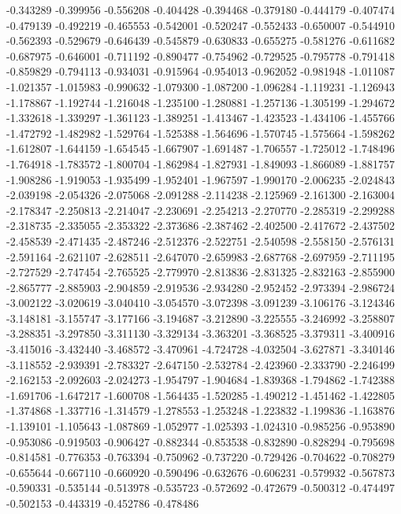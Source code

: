 -0.343289
-0.399956
-0.556208
-0.404428
-0.394468
-0.379180
-0.444179
-0.407474
-0.479139
-0.492219
-0.465553
-0.542001
-0.520247
-0.552433
-0.650007
-0.544910
-0.562393
-0.529679
-0.646439
-0.545879
-0.630833
-0.655275
-0.581276
-0.611682
-0.687975
-0.646001
-0.711192
-0.890477
-0.754962
-0.729525
-0.795778
-0.791418
-0.859829
-0.794113
-0.934031
-0.915964
-0.954013
-0.962052
-0.981948
-1.011087
-1.021357
-1.015983
-0.990632
-1.079300
-1.087200
-1.096284
-1.119231
-1.126943
-1.178867
-1.192744
-1.216048
-1.235100
-1.280881
-1.257136
-1.305199
-1.294672
-1.332618
-1.339297
-1.361123
-1.389251
-1.413467
-1.423523
-1.434106
-1.455766
-1.472792
-1.482982
-1.529764
-1.525388
-1.564696
-1.570745
-1.575664
-1.598262
-1.612807
-1.644159
-1.654545
-1.667907
-1.691487
-1.706557
-1.725012
-1.748496
-1.764918
-1.783572
-1.800704
-1.862984
-1.827931
-1.849093
-1.866089
-1.881757
-1.908286
-1.919053
-1.935499
-1.952401
-1.967597
-1.990170
-2.006235
-2.024843
-2.039198
-2.054326
-2.075068
-2.091288
-2.114238
-2.125969
-2.161300
-2.163004
-2.178347
-2.250813
-2.214047
-2.230691
-2.254213
-2.270770
-2.285319
-2.299288
-2.318735
-2.335055
-2.353322
-2.373686
-2.387462
-2.402500
-2.417672
-2.437502
-2.458539
-2.471435
-2.487246
-2.512376
-2.522751
-2.540598
-2.558150
-2.576131
-2.591164
-2.621107
-2.628511
-2.647070
-2.659983
-2.687768
-2.697959
-2.711195
-2.727529
-2.747454
-2.765525
-2.779970
-2.813836
-2.831325
-2.832163
-2.855900
-2.865777
-2.885903
-2.904859
-2.919536
-2.934280
-2.952452
-2.973394
-2.986724
-3.002122
-3.020619
-3.040410
-3.054570
-3.072398
-3.091239
-3.106176
-3.124346
-3.148181
-3.155747
-3.177166
-3.194687
-3.212890
-3.225555
-3.246992
-3.258807
-3.288351
-3.297850
-3.311130
-3.329134
-3.363201
-3.368525
-3.379311
-3.400916
-3.415016
-3.432440
-3.468572
-3.470961
-4.724728
-4.032504
-3.627871
-3.340146
-3.118552
-2.939391
-2.783327
-2.647150
-2.532784
-2.423960
-2.333790
-2.246499
-2.162153
-2.092603
-2.024273
-1.954797
-1.904684
-1.839368
-1.794862
-1.742388
-1.691706
-1.647217
-1.600708
-1.564435
-1.520285
-1.490212
-1.451462
-1.422805
-1.374868
-1.337716
-1.314579
-1.278553
-1.253248
-1.223832
-1.199836
-1.163876
-1.139101
-1.105643
-1.087869
-1.052977
-1.025393
-1.024310
-0.985256
-0.953890
-0.953086
-0.919503
-0.906427
-0.882344
-0.853538
-0.832890
-0.828294
-0.795698
-0.814581
-0.776353
-0.763394
-0.750962
-0.737220
-0.729426
-0.704622
-0.708279
-0.655644
-0.667110
-0.660920
-0.590496
-0.632676
-0.606231
-0.579932
-0.567873
-0.590331
-0.535144
-0.513978
-0.535723
-0.572692
-0.472679
-0.500312
-0.474497
-0.502153
-0.443319
-0.452786
-0.478486
